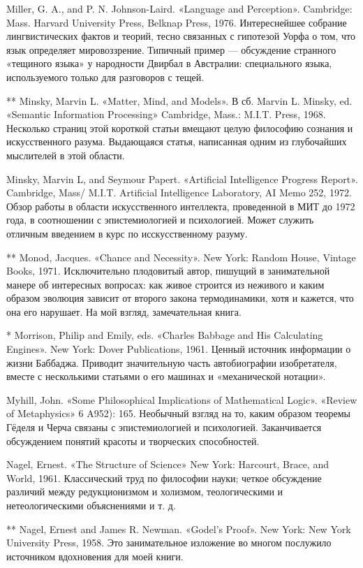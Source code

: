 Miller, G. A., and P. N. Johnson-Laird. «Language and Perception». Cambridge: Mass. Harvard University Press, Belknap Press, 1976. Интереснейшее собрание лингвистических фактов и теорий, тесно связанных с гипотезой Уорфа о том, что язык определяет мировоззрение. Типичный пример --- обсуждение странного «тещиного языка» у народности Двирбал в Австралии: специального языка, используемого только для разговоров с тещей.

** Minsky, Marvin L. «Matter, Mind, and Models». В сб. Marvin L. Minsky, ed. «Semantic Information Processing» Cambridge, Mass.: M.I.T. Press, 1968. Несколько страниц этой короткой статьи вмещают целую философию сознания и искусственного разума. Выдающаяся статья, написанная одним из глубочайших мыслителей в этой области.

Minsky, Marvin L, and Seymour Papert. «Artificial Intelligence Progress Report». Cambridge, Mass/ M.I.T. Artificial Intelligence Laboratory, AI Memo 252, 1972. Обзор работы в области искусственного интеллекта, проведенной в МИТ до 1972 года, в соотношении с эпистемиологией и психологией. Может служить отличным введением в курс по исскусственному разуму.

** Monod, Jacques. «Chance and Necessity». New York: Random House, Vintage Books, 1971. Исключительно плодовитый автор, пишущий в занимательной манере об интересных вопросах: как живое строится из неживого и каким образом эволюция зависит от второго закона термодинамики, хотя и кажется, что она его нарушает. На мой взгляд, замечательная книга.

* Morrison, Philip and Emily, eds. «Charles Babbage and His Calculating Engines». New York: Dover Publications, 1961. Ценный источник информации о жизни Баббаджа. Приводит значительную часть автобиографии изобретателя, вместе с несколькими статьями о его машинах и «механической нотации».

Myhill, John. «Some Philosophical Implications of Mathematical Logic». «Review of Metaphysics» 6 A952): 165. Необычный взгляд на то, каким образом теоремы Гёделя и Черча связаны с эпистемиологией и психологией. Заканчивается обсуждением понятий красоты и творческих способностей.

Nagel, Ernest. «The Structure of Science» New York: Harcourt, Brace, and World, 1961. Классический труд по философии науки; четкое обсуждение различий между редукционизмом и холизмом, теологическими и нетеологическими объяснениями и т. д.

** Nagel, Ernest and James R. Newman. «Godel's Proof». New York: New York University Press, 1958. Это занимательное изложение во многом послужило источником вдохновения для моей книги.

